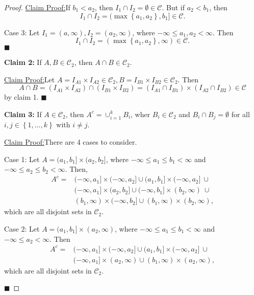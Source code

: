 \documentclass[12pt]{article}
\newenvironment{claimproof}[1]{\par\noindent\underline{Claim Proof:}\space#1}{\hfill $\blacksquare$}
\begin{document}
\begin{proof}
\begin{claimproof}
If $b_{1} < a_{2}$, then $I_{1}\cap I_{2} = \emptyset \in \mathcal{C}$. But if $a_{2} < b_{1}$, then 
\[ I_{1} \cap I_{2} = (\max\left\{ a_{1},a_{2} \right\}, b_{1}] \in \mathcal{C}. \]

Case 3: Let $I_{1} = (a, \infty), I_{2} = (a_{2}, \infty)$, where $-\infty \leq a_{1},a_{2} < \infty$. Then 
\[ I_{1} \cap I_{2} = (\max \left\{ a_{1},a_{2} \right\}, \infty) \in \mathcal{C}. \]
\end{claimproof} 

{\bf Claim 2:} If $A,B \in \mathcal{C}_{2}$, then $A\cap B \in \mathcal{C}_{2}$.

\begin{claimproof}
Let $A = I_{A1} \times I_{A2} \in \mathcal{C}_{2}, B = I_{B1}\times I_{B2} \in \mathcal{C}_{2}$. Then 
\[ A\cap B = (I_{A1} \times I_{A2}) \cap (I_{B1}\times I_{B2}) = (I_{A1}\cap I_{B1}) \times (I_{A2}\cap I_{B2}) \in \mathcal{C} \]
by claim 1.
\end{claimproof}

{\bf Claim 3:} If $A \in \mathcal{C}_{2}$, then $A^{c} = \cup_{i=1}^{k}B_{i}$, wher $B_{i} \in \mathcal{C}_{2}$ and $B_{i} \cap B_{j} = \emptyset$ for
all $i,j \in \left\{ 1, \dots, k \right\}$ with $i \neq j$.

\begin{claimproof}
There are 4 cases to consider.

Case 1: Let $A = (a_{1}, b_{1}] \times (a_{2}, b_{2}]$, where $-\infty \leq a_{1} \leq b_{1} < \infty$ and $-\infty \leq a_{2} \leq b_{2} < \infty$.
Then,
\begin{align*}
A^{c} = & (-\infty, a_{1}] \times (-\infty, a_{2}] \cup (a_{1},b_{1}] \times (-\infty, a_{2}]\ \cup \\
& (-\infty, a_{1}] \times (a_{2}, b_{2}] \cup (-\infty, b_{1}] \times (b_{2}, \infty)\ \cup \\
& (b_{1}, \infty) \times (-\infty, b_{2}] \cup (b_{1}, \infty) \times (b_{2}, \infty),
\end{align*}
which are all disjoint sets in $\mathcal{C}_{2}$.

Case 2: Let $A = (a_{1}, b_{1}] \times (a_{2}, \infty)$, where $-\infty \leq a_{1} \leq b_{1} < \infty$ and $-\infty \leq a_{2} < \infty$. Then 
\begin{align*}
A^{c} = & (-\infty, a_{1}] \times (-\infty, a_{2}] \cup (a_{1}, b_{1}] \times (-\infty, a_{2}]\ \cup \\
& (-\infty, a_{1}] \times (a_{2}, \infty) \cup (b_{1}, \infty) \times (a_{2}, \infty),
\end{align*}
which are all disjoint sets in $\mathcal{C}_{2}$.


\end{claimproof}
\end{proof}
\end{document}

